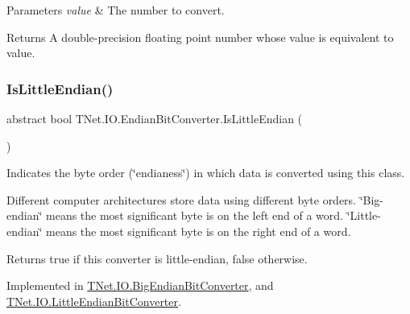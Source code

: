 \begin{DoxyParams}{Parameters}
{\em value} & The number to convert. \\
\hline
\end{DoxyParams}
\begin{DoxyReturn}{Returns}
A double-\/precision floating point number whose value is equivalent to value.
\end{DoxyReturn}
\mbox{\label{class_t_net_1_1_i_o_1_1_endian_bit_converter_a0fe24cd850d8da0da9f75ef0467551cb}} 
\subsubsection{\texorpdfstring{Is\+Little\+Endian()}{IsLittleEndian()}}
{\footnotesize\ttfamily abstract bool T\+Net.\+I\+O.\+Endian\+Bit\+Converter.\+Is\+Little\+Endian (\begin{DoxyParamCaption}{ }\end{DoxyParamCaption})\hspace{0.3cm}{\ttfamily [pure virtual]}}



Indicates the byte order (\char`\"{}endianess\char`\"{}) in which data is converted using this class. 

Different computer architectures store data using different byte orders. \char`\"{}\+Big-\/endian\char`\"{} means the most significant byte is on the left end of a word. \char`\"{}\+Little-\/endian\char`\"{} means the most significant byte is on the right end of a word. 

\begin{DoxyReturn}{Returns}
true if this converter is little-\/endian, false otherwise.
\end{DoxyReturn}


Implemented in \mbox{\hyperlink{class_t_net_1_1_i_o_1_1_big_endian_bit_converter_a277e4b24764d25a882042be3c2e1f231}{T\+Net.\+I\+O.\+Big\+Endian\+Bit\+Converter}}, and \mbox{\hyperlink{class_t_net_1_1_i_o_1_1_little_endian_bit_converter_a72c11f0120a83ac3a81574f98beb7278}{T\+Net.\+I\+O.\+Little\+Endian\+Bit\+Converter}}.

\mbox{\label{class_t_net_1_1_i_o_1_1_endian_bit_converter_ac93b60f01cf809e9f290c3f4793f79cd}} 
